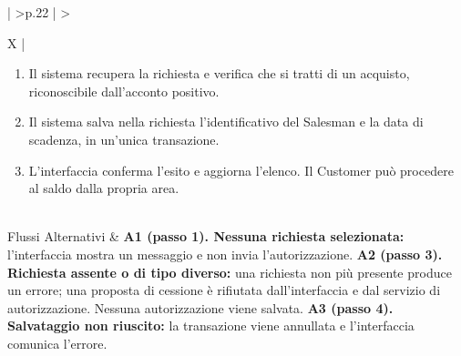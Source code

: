 \begin{xltabular}{\textwidth}{| >{\bfseries}p{.22\textwidth} | >{\raggedright\arraybackslash}X |}
\begin{enumerate}[label=\arabic*.,start=1,leftmargin=*,nosep]
  \item Il sistema recupera la richiesta e verifica che si tratti di un acquisto, riconoscibile dall'acconto positivo.
  \item Il sistema salva nella richiesta l'identificativo del Salesman e la data di scadenza, in un'unica transazione.
  \item L'interfaccia conferma l'esito e aggiorna l'elenco. Il Customer può procedere al saldo dalla propria area.
\end{enumerate}\\\hline
Flussi Alternativi &
\textbf{A1 (passo 1). Nessuna richiesta selezionata:} l'interfaccia mostra un messaggio e non invia l'autorizzazione.\newline\newline
\textbf{A2 (passo 3). Richiesta assente o di tipo diverso:} una richiesta non più presente produce un errore; una proposta di cessione è rifiutata dall'interfaccia e dal servizio di autorizzazione. Nessuna autorizzazione viene salvata.\newline\newline
\textbf{A3 (passo 4). Salvataggio non riuscito:} la transazione viene annullata e l'interfaccia comunica l'errore.\\\hline
\end{xltabular}
